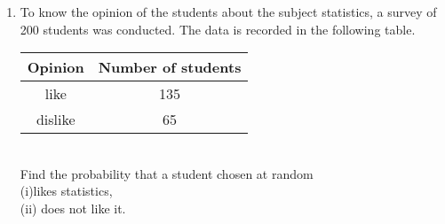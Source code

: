 \renewcommand{\theequation}{\theenumi}
\begin{enumerate}[label=\arabic*.,ref=\thesubsection.\theenumi]
\item To know the opinion of the students about the subject statistics, a survey of 200 students was conducted. The data is recorded in the following table.\\
\begin{tabular}{ |c|c| } 
	\hline
	\textbf{Opinion} &\textbf{Number of students}\\
	\hline
	like  &135\\ 
	dislike  &65\\ 
	\hline
\end{tabular}\\
Find the probability that a student chosen at random\\
(i)likes statistics,\\
(ii) does not like it.
\end{enumerate}
